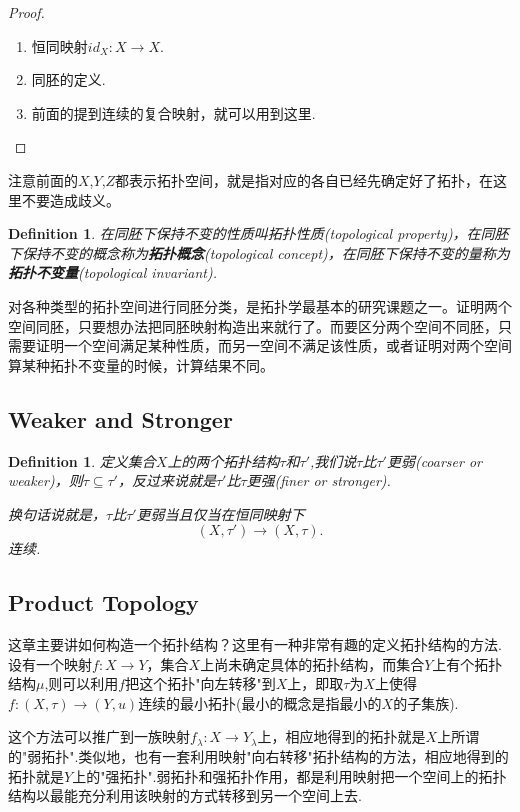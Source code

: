 \documentclass{article}
\newtheorem{definition}[theorem]{Definition}
\newcommand*{\xfunc}[4]{{#2}\colon{#3}{#1}{#4}}
\newcommand*{\func}[3]{\xfunc{\to}{#1}{#2}{#3}}
\begin{document}
\begin{proof}
\begin{enumerate}
	\item 恒同映射$\func{id_X}{X}{X}$.
	\item 同胚的定义.
	\item 前面的提到连续的复合映射，就可以用到这里.
\end{enumerate}
\end{proof}

注意前面的$X$,$Y$,$Z$都表示拓扑空间，就是指对应的各自已经先确定好了拓扑，在这里不要造成歧义。

\begin{definition}
在同胚下保持不变的性质叫拓扑性质(topological property)，在同胚下保持不变的概念称为\textbf{拓扑概念}(topological concept)，在同胚下保持不变的量称为\textbf{拓扑不变量}(topological invariant).
\end{definition}

对各种类型的拓扑空间进行同胚分类，是拓扑学最基本的研究课题之一。证明两个空间同胚，只要想办法把同胚映射构造出来就行了。而要区分两个空间不同胚，只需要证明一个空间满足某种性质，而另一空间不满足该性质，或者证明对两个空间算某种拓扑不变量的时候，计算结果不同。

\newpage
\subsection{Weaker and Stronger}

\begin{definition}
定义集合$X$上的两个拓扑结构$\tau$和$\tau'$,我们说$\tau$比$\tau'$更弱(coarser or weaker)，则$\tau \subseteq \tau'$，反过来说就是$\tau'$比$\tau$更强(finer or stronger).

换句话说就是，$\tau$比$\tau'$更弱当且仅当在恒同映射下 \[ (X,\tau') \rightarrow (X,\tau).\]连续.
\end{definition}



\newpage
\subsection{Product Topology}
这章主要讲如何构造一个拓扑结构？这里有一种非常有趣的定义拓扑结构的方法.设有一个映射$\func{f}{X}{Y}$，集合$X$上尚未确定具体的拓扑结构，而集合$Y$上有个拓扑结构$\mu$,则可以利用$f$把这个拓扑"向左转移"到$X$上，即取$\tau$为$X$上使得$\func{f}{(X,\tau)}{(Y,u)}$连续的最小拓扑(最小的概念是指最小的$X$的子集族).

这个方法可以推广到一族映射$\func{f_\lambda}{X}{Y_\lambda}$上，相应地得到的拓扑就是$X$上所谓的"弱拓扑".类似地，也有一套利用映射"向右转移"拓扑结构的方法，相应地得到的拓扑就是$Y$上的"强拓扑".弱拓扑和强拓扑作用，都是利用映射把一个空间上的拓扑结构以最能充分利用该映射的方式转移到另一个空间上去.
\end{document}
